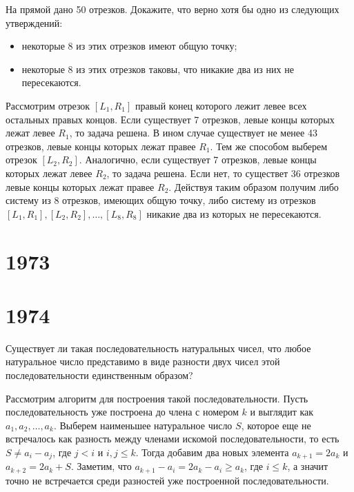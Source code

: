 \documentclass[11pt, a4paper]{template}
\begin{document}
\begin{exercise}[M154]
На прямой дано 50 отрезков. Докажите, что верно хотя бы одно из следующих
утверждений:
\begin{itemize}
\item некоторые 8 из этих отрезков имеют общую точку;
\item некоторые 8 из этих отрезков таковы, что никакие два из них не пересекаются.
\end{itemize}
\end{exercise}

\begin{solution}
Рассмотрим отрезок $[L_{1}, R_{1}]$ правый конец которого лежит левее всех остальных правых концов. Если существует 7 отрезков, левые концы которых лежат левее $R_{1}$, то задача решена. В ином случае существует не менее 43 отрезков, левые концы которых лежат правее $R_{1}$. Тем же способом выберем отрезок $[L_{2}, R_{2}]$. Аналогично, если существует 7 отрезков, левые концы которых лежат левее $R_{2}$, то задача решена. Если нет, то существет 36 отрезков левые концы которых лежат правее $R_{2}$. Действуя таким образом получим либо систему из 8 отрезков, имеющих общую точку, либо систему из отрезков $[L_{1}, R_{1}], [L_{2}, R_{2}], \dots, [L_{8}, R_{8}]$ никакие два из которых не пересекаются. 
\end{solution}

\chapter{1973}



\chapter{1974}

\begin{exercise}[M287]
Существует ли такая последовательность натуральных чисел, что любое натуральное число представимо в виде разности двух чисел этой последовательности единственным образом?
\end{exercise}

\begin{solution}
Рассмотрим алгоритм для построения такой последовательности. Пусть последовательность уже построена до члена с номером $k$ и выглядит как $a_{1}, a_{2}, \dots, a_{k}$. Выберем наименьшее натуральное число $S$, которое еще не встречалось как разность между членами искомой последовательности, то есть $S \neq a_{i} - a_{j}$, где $j < i$ и $i, j \leqslant k$. Тогда добавим два новых элемента $a_{k+1} = 2a_{k}$ и $a_{k+2} = 2a_{k} + S$. Заметим, что $a_{k+1} - a_{i} = 2a_{k} - a_{i} \geqslant a_{k}$, где $i \leqslant k$, а значит точно не встречается среди разностей уже построенной последовательности. 
\end{solution}
\end{document}

